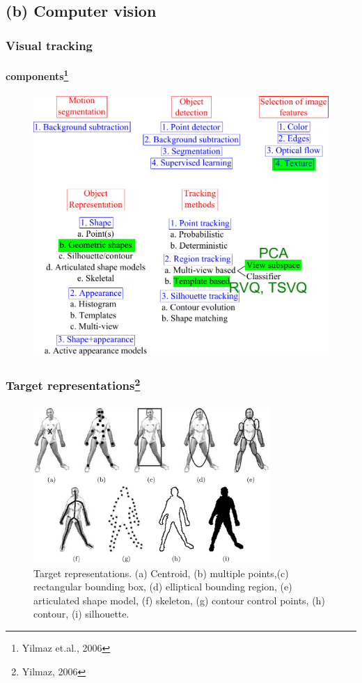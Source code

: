 \subsection{(b) Computer vision}

\begin{frame}
\frametitle{Visual tracking}
\framesubtitle{components\tiny{\footnote {Yilmaz et.al., 2006}}}
\mypagenum
\begin{figure}
\includegraphics[height=0.8\textheight]{thesis/TRK_overview.pdf}
\end{figure}	
\end{frame}


\begin{frame}
\frametitle{Target representations\footnote{Yilmaz, 2006}}
\framesubtitle{}
\mypagenum
\begin{figure}[t]
\center
\includegraphics[width=0.8\textwidth]{thesis/2006_JNL_TRKsurvey_Shah_fig1.png}
\caption{Target representations.  (a) Centroid, (b) multiple points,(c) rectangular bounding box, (d) elliptical bounding region, (e) articulated shape model, (f) skeleton, (g) contour control points, (h) contour, (i) silhouette.}
\label{fig:TRK_objectRepresentations}
\end{figure}
\end{frame}


